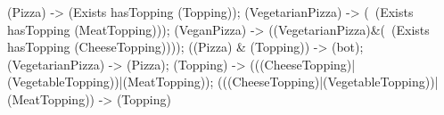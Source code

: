 (Pizza) -> (Exists hasTopping (Topping));
(VegetarianPizza) -> (~(Exists hasTopping (MeatTopping)));
(VeganPizza) -> ((VegetarianPizza)&(~(Exists hasTopping (CheeseTopping))));
((Pizza) & (Topping)) -> (bot);
(VegetarianPizza) -> (Pizza);
(Topping) -> (((CheeseTopping)|(VegetableTopping))|(MeatTopping));
(((CheeseTopping)|(VegetableTopping))|(MeatTopping)) -> (Topping)
